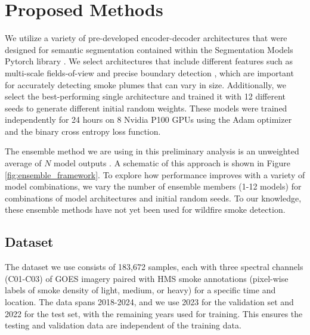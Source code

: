 \documentclass{article}
\begin{document}
\section{Proposed Methods}
We utilize a variety of pre-developed encoder-decoder architectures that were designed for semantic segmentation contained within the Segmentation Models Pytorch library \citep{semantic}. We select architectures that include different features such as multi-scale fields-of-view and precise boundary detection \citep{dlv3p,PAN,UNetpp}, which are important for accurately detecting smoke plumes that can vary in size. Additionally, we select the best-performing single architecture and trained it with 12 different seeds to generate different initial random weights. These models were trained independently for 24 hours on 8 Nvidia P100 GPUs using the Adam optimizer and the binary cross entropy loss function. 


The ensemble method we are using in this preliminary analysis is an unweighted average of $N$ model outputs \citep{nn-ensemble2}. A schematic of this approach is shown in Figure \ref{fig:ensemble_framework}. To explore how performance improves with a variety of model combinations, we vary the number of ensemble members (1-12 models) for combinations of model architectures and initial random seeds. To our knowledge, these ensemble methods have not yet been used for wildfire smoke detection.

\subsection{Dataset}
The dataset we use consists of 183,672 samples, each with three spectral channels (C01-C03) of GOES imagery paired with HMS smoke annotations (pixel-wise labels of smoke density of light, medium, or heavy) for a specific time and location. The data spans 2018-2024, and we use 2023 for the validation set and 2022 for the test set, with the remaining years used for training. This ensures the testing and validation data are independent of the training data.
\end{document}
